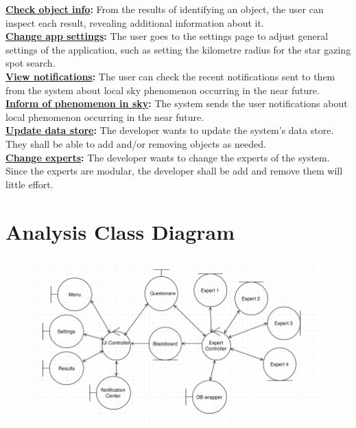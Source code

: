 \documentclass[]{article}
\begin{document}
\newline
\textbf{\underline{Check object info}:} From the results of identifying an object, the user can inspect each result, revealing additional information about it. \\
\newline
\textbf{\underline{Change app settings}:} The user goes to the settings page to adjust general settings of the application, such as setting the kilometre radius for the star gazing spot search. \\
\newline
\textbf{\underline{View notifications}:} The user can check the recent notifications sent to them from the system about local sky phenomenon occurring in the near future. \\
\newline
\textbf{\underline{Inform of phenomenon in sky}:} The system sends the user notifications about local phenomenon occurring in the near future. \\
\newline
\textbf{\underline{Update data store}:} The developer wants to update the system's data store. They shall be able to add and/or removing objects as needed. \\
\newline
\textbf{\underline{Change experts}:} The developer wants to change the experts of the system. Since the experts are modular, the developer shall be add and remove them will little effort. \\

\section{Analysis Class Diagram}
\label{sec:analysis_class_diagram}
\begin{figure}[h!]
    \centering
    \includegraphics[scale=0.5]{analysis.png}
\end{figure}
\end{document}
